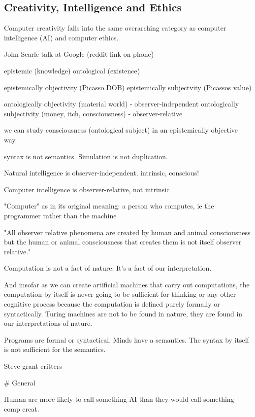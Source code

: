 \subsection{Creativity, Intelligence and Ethics}

Computer creativity falls into the same overarching category as computer intelligence (\ac{AI}) and computer ethics.



John Searle talk at Google (reddit link on phone) \autocite{Searle2015}

epistemic (knowledge)
ontological (existence)

epistemically objectivity (Picasso DOB)
epistemically subjectvity (Picassos value)

ontologically objectivity (material world) - observer-independent
ontologically subjectivity (money, itch, consciousness) - observer-relative

we can study consciousness (ontological subject) in an epistemically objective way.

syntax is not semantics.
Simulation is not duplication.


Natural intelligence is observer-independent, intrinsic, conscious!

Computer intelligence is observer-relative, not intrinsic

"Computer" as in its original meaning: a person who computes, ie the programmer rather than the machine

"All observer relative phenomena are created by human and animal consciousness but the human or animal consciousness that creates them is not itself observer relative."

Computation is not a fact of nature. It's a fact of our interpretation. 

And insofar as we can create artificial machines that carry out computations, the computation by itself is never going to be sufficient for thinking or any other cognitive process because the computation is defined purely formally or syntactically. Turing machines are not to be found in nature, they are found in our interpretations of nature. 

Programs are formal or syntactical. 
Minds have a semantics. 
The syntax by itself is not sufficient for the semantics. 

Steve grant critters


# General

Human are more likely to call something AI than they would call something comp creat.






